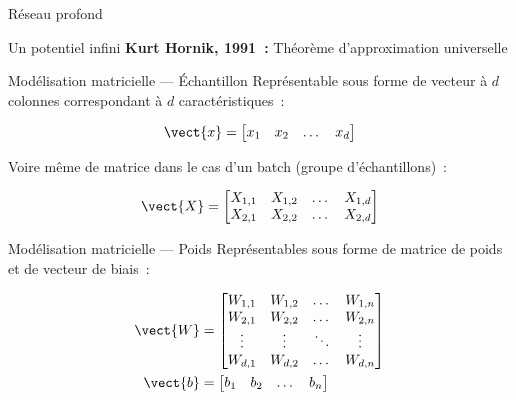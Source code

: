 \begin{frame}{Réseau profond}
  \centering
\end{frame}

\begin{frame}{Un potentiel infini}
  \textbf{Kurt Hornik, 1991~:} Théorème d'approximation universelle
\end{frame}

\begin{frame}{Modélisation matricielle --- Échantillon}
  Représentable sous forme de vecteur à $d$ colonnes correspondant à $d$ caractéristiques~:

  \[
    \vect{x} = \begin{bmatrix}
      x_1 & x_2 & \dots & x_d
    \end{bmatrix}
  \]

  Voire même de matrice dans le cas d'un batch (groupe d'échantillons)~:

  \[
    \vect{X} = \begin{bmatrix}
      X_{1,1} & X_{1,2} & \dots & X_{1,d} \\
      X_{2,1} & X_{2,2} & \dots & X_{2,d}
    \end{bmatrix}
  \]
\end{frame}

\begin{frame}{Modélisation matricielle --- Poids}
  Représentables sous forme de matrice de poids et de vecteur de biais~:

  \begin{align*}
    \vect{W} & = \begin{bmatrix}
      W_{1,1} & W_{1,2} & \dots  & W_{1,n} \\
      W_{2,1} & W_{2,2} & \dots  & W_{2,n} \\
      \vdots & \vdots & \ddots & \vdots \\
      W_{d,1} & W_{d,2} & \dots  & W_{d,n}
    \end{bmatrix} \\
    \vect{b} & = \begin{bmatrix}
      b_1 & b_2 & \dots & b_n
    \end{bmatrix}
  \end{align*}
\end{frame}

